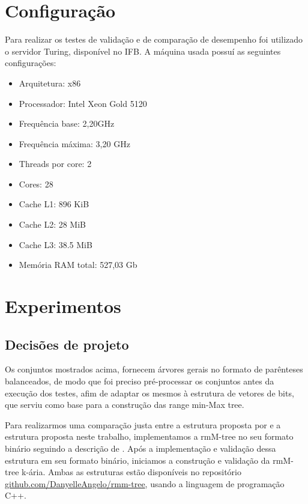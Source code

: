 \section{Configuração}\label{sec:configuracao}
Para realizar os testes de validação e de comparação de desempenho foi utilizado o servidor Turing, disponível no IFB. A máquina usada possuí as seguintes configurações:
\begin{itemize}
    \item Arquitetura: x86
    \item Processador: Intel Xeon Gold 5120
    \item Frequência base: 2,20GHz
    \item Frequência máxima: 3,20 GHz
    \item Threads por core: 2
    \item Cores: 28
    \item Cache L1: 896 KiB
    \item Cache L2: 28 MiB
    \item Cache L3: 38.5 MiB
    \item Memória RAM total: 527,03 Gb
\end{itemize}

\section{Experimentos}\label{sec:experimentos}
\subsection{Decisões de projeto}
Os conjuntos mostrados acima, fornecem árvores gerais no formato de parênteses balanceados, de modo que foi preciso pré-processar os conjuntos antes da execução dos testes, afim de adaptar os mesmos à estrutura de vetores de bits, que serviu como base para a construção das range min-Max tree.

Para realizarmos uma comparação justa entre a estrutura proposta por \citet{paper-fully-functinal-succint-trees} e a estrutura proposta neste trabalho,  implementamos a rmM-tree no seu formato binário seguindo a descrição de \citet{book-compact-data-structures}. Após a implementação e validação dessa estrutura em seu formato binário, iniciamos a construção e validação da rmM-tree k-ária. Ambas as estruturas estão disponíveis no repositório \href{https://github.com/DanyelleAngelo/rmm-tree}{github.com/DanyelleAngelo/rmm-tree}, usando a linguagem de programação C++.

